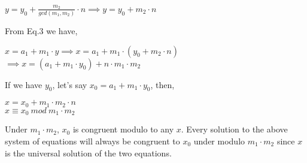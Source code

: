 \documentclass[11pt]{article}
\begin{document}
\begin{center}
    $y = y_0 + \frac{m_2}{gcd(m_1, m_2)} \cdot n \implies y = y_0 + m_2 \cdot n$
\end{center}
From Eq.3 we have, 
\begin{center}
    $x = a_1 + m_1 \cdot y \implies x = a_1 + m_1 \cdot (y_0 + m_2 \cdot n)$\\
    \vspace{1mm}
    $\implies x = (a_1 + m_1 \cdot y_0) + n \cdot m_1 \cdot m_2$
\end{center}
If we have $y_0$, let's say $x_0 = a_1 + m_1 \cdot y_0$, then,
\begin{center}
    $x = x_0 + m_1 \cdot m_2 \cdot n$\\
    \vspace{1mm}
    $x \equiv x_0 \ mod \ m_1 \cdot m_2$
\end{center}
Under $m_1 \cdot m_2$, $x_0$ is congruent modulo to any $x$. Every solution to the above system of equations will always be congruent to $x_0$ under modulo $m_1 \cdot m_2$ since $x$ is the universal solution of the two equations.
\newpage
\end{document}

